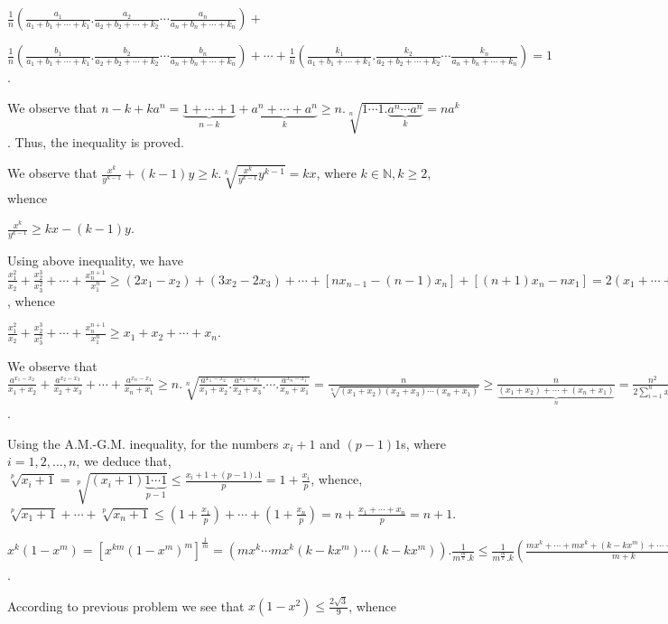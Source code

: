   $\frac{1}{n}\left(\frac{a_1}{a_1 + b_1 + \cdots + k_1}.\frac{a_2}{a_2 + b_2 + \cdots + k_2}\cdots
  \frac{a_n}{a_n + b_n + \cdots + k_n}\right) +$

  $\frac{1}{n}\left(\frac{b_1}{a_1 + b_1 + \cdots +
    k_1}.\frac{b_2}{a_2 + b_2 + \cdots + k_2}\cdots\frac{b_n}{a_n + b_n + \cdots + k_n}\right) + \cdots +
  \frac{1}{n}\left(\frac{k_1}{a_1 + b_1 + \cdots + k_1}.\frac{k_2}{a_2 + b_2 + \cdots + k_2}\cdots
  \frac{k_n}{a_n + b_n + \cdots + k_n}\right) = 1$.
\item We observe that $n - k + ka^n = \underbrace{1 + \cdots + 1}_{n - k} + \underbrace{a^n + \cdots +
  a^n}_{k}\geq n.\sqrt[n]{1\cdots 1.\underbrace{a^n\cdots a^n}_{k}} = na^k$. Thus, the inequality is proved.
\item We observe that $\frac{x^k}{y^{k - 1}} + (k - 1)y\geq k.\sqrt[k]{\frac{x^k}{y^{k - 1}}y^{k - 1}} =
  kx$, where $k\in\mathbb{N}, k\geq 2$, whence

  $\frac{x^k}{y^{k - 1}}\geq kx - (k - 1)y$.

  Using above inequality, we have $\frac{x_1^2}{x_2} + \frac{x_2^3}{x_3^2} + \cdots + \frac{x_n^{n +
      1}}{x_1^n}\geq (2x_1 - x_2) + (3x_2 - 2x_3) + \cdots + [nx_{n - 1} - (n - 1)x_n] + [(n + 1)x_n - nx_1]
  = 2(x_1 + \cdots + x_n) - nx_1\geq x_1 + \cdots + x_n$, whence

  $\frac{x_1^2}{x_2} + \frac{x_2^3}{x_3^2} + \cdots + \frac{x_n^{n + 1}}{x_1^n}\geq x_1 + x_2 + \cdots +
  x_n$.
\item We observe that $\frac{a^{x_1 - x_2}}{x_1 + x_2} + \frac{a^{x_2 - x_3}}{x_2 + x_3} + \cdots +
  \frac{a^{x_n - x_1}}{x_n + x_1}\geq n.\sqrt[n]{\frac{a^{x_1 - x_2}}{x_1 + x_2} . \frac{a^{x_2 - x_3}}{x_2
      + x_3} . \cdots . \frac{a^{x_n - x_1}}{x_n + x_1}} = \frac{n}{\sqrt[n]{(x_1 + x_2)(x_2 + x_3)
      \cdots(x_n + x_1)}}\geq \frac{n}{\underbrace{(x_1 + x_2) + \cdots + (x_n + x_1)}_{n}} =
  \frac{n^2}{2\displaystyle\sum_{i = 1}^nx_i}$.
\item Using the A.M.-G.M. inequality, for the numbers $x_i + 1$ and $(p - 1)1$\symbol[rightquote]s, where $i
  = 1, 2, \ldots, n$, we deduce that, $\sqrt[p]{x_i + 1} = \displaystyle\sqrt[p]{(x_i +
    1)\underbrace{1\cdots 1}_{p - 1}}\leq \frac{x_i + 1 + (p - 1).1}{p} = 1 + \frac{x_i}{p}$, whence,
  $\sqrt[p]{x_1 + 1} + \cdots + \sqrt[p]{x_n + 1}\leq \left(1 + \frac{x_1}{p}\right) + \cdots + \left(1 +
  \frac{x_n}{p}\right) = n + \frac{x_1 + \cdots + x_n}{p} = n + 1$.
\item $x^k(1 - x^m) = [x^{km}(1 - x^m)^m]^{\frac{1}{m}} = \left(mx^k \cdots mx^k(k - kx^m)\cdots (k -
  kx^m)\right).\frac{1}{m^{\frac{m}{k}}.k}\leq \frac{1}{m^{\frac{m}{k}}.k}\left(\frac{mx^k + \cdots + mx^k +
    (k - kx^m) + \cdots + (k - kx^m)}{m + k}\right) = \frac{k^{\frac{k}{m}}.m}{(m + k)^{\frac{k}{m} + 1}}$.
\item According to previous problem we see that $x(1 - x^2)\leq \frac{2\sqrt{3}}{9}$, whence

